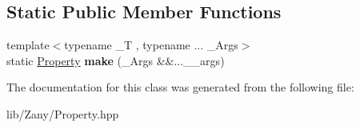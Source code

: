 \subsection*{Static Public Member Functions}
\begin{DoxyCompactItemize}
\item 
\mbox{\label{classzany_1_1_property_a8c1795b5a1cf84d223f66388bf0f6634}} 
{\footnotesize template$<$typename \+\_\+T , typename ... \+\_\+\+Args$>$ }\\static \hyperlink{classzany_1_1_property}{Property} {\bfseries make} (\+\_\+\+Args \&\&...\+\_\+\+\_\+args)
\end{DoxyCompactItemize}


The documentation for this class was generated from the following file\+:\begin{DoxyCompactItemize}
\item 
lib/\+Zany/Property.\+hpp\end{DoxyCompactItemize}
